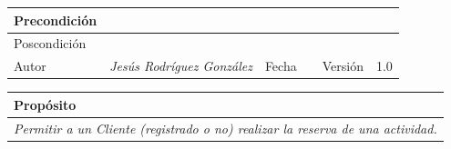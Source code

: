 \begin{table}[H]
\begin{tabular}{llllllll}
    \multicolumn{1}{|l|}{Precondición}                           & \multicolumn{7}{p{10cm}|}{{\color[HTML]{808080} \textit{}}}                                                                                                                                                                                                                                   \\ \hline
    \multicolumn{1}{|l|}{Poscondición}                           & \multicolumn{7}{l|}{{\color[HTML]{808080} \textit{}}}                                                                                                                                                                                                                                                       \\ \hline
    \multicolumn{1}{|l|}{Autor}                                  & \multicolumn{1}{l|}{{\color[HTML]{808080} \textit{Jesús Rodríguez González}}}                           & \multicolumn{2}{l|}{Fecha}                                                   & \multicolumn{1}{l|}{}                          & \multicolumn{2}{l|}{Versión}                                                      & \multicolumn{1}{l|}{1.0}                                                     \\ \hline
    \end{tabular}
    \end{table}

    \begin{table}[H]
        \begin{tabular}{llllllll}
    \hline
    \multicolumn{8}{|l|}{\cellcolor[HTML]{F2F2F2}Propósito}                                                                                                                                                                                                                                                                                                                                                                                           \\ \hline
    \multicolumn{8}{|p{15cm}|}{{\color[HTML]{808080} \textit{Permitir a un Cliente (registrado o no) realizar la reserva de una actividad.}}}                                                                                                                                                                                                             \\ \hline
    \end{tabular}
    \end{table}

